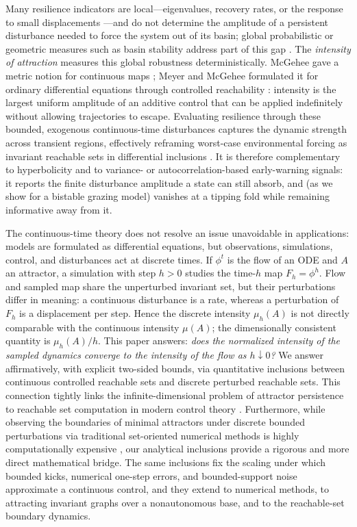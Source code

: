 \documentclass[pdflatex,sn-mathphys-num]{sn-jnl}
\numberwithin{equation}{section}
\theoremstyle{thmstyleone}%
\theoremstyle{definition}
\theoremstyle{remark}
\begin{document}
Many resilience indicators are local---eigenvalues, recovery rates, or the response to small displacements \citep{krakovska2024resilience}---and do not determine the amplitude of a persistent disturbance needed to force the system out of its basin; global probabilistic or geometric measures such as basin stability address part of this gap \citep{menck2013basin,menck2014dead,liang2025global,mitra2015integrative,klinshov2016stability,wang2025multi}. The \emph{intensity of attraction} measures this global robustness deterministically. McGehee gave a metric notion for continuous maps \citep{mcgehee1988some}; Meyer and McGehee formulated it for ordinary differential equations through controlled reachability \citep{meyer2022intensity}: intensity is the largest uniform amplitude of an additive control that can be applied indefinitely without allowing trajectories to escape. Evaluating resilience through these bounded, exogenous continuous-time disturbances captures the dynamic strength across transient regions, effectively reframing worst-case environmental forcing as invariant reachable sets in differential inclusions \citep{li2007morse,meyer2016mathematical}. It is therefore complementary to hyperbolicity and to variance- or autocorrelation-based early-warning signals: it reports the finite disturbance amplitude a state can still absorb, and (as we show for a bistable grazing model) vanishes at a tipping fold while remaining informative away from it.

The continuous-time theory does not resolve an issue unavoidable in applications: models are formulated as differential equations, but observations, simulations, control, and disturbances act at discrete times.
If $\phi^t$ is the flow of an ODE and $A$ an attractor, a simulation with step $h>0$ studies the time-$h$ map $F_h=\phi^h$. Flow and sampled map share the unperturbed invariant set, but their perturbations differ in meaning: a continuous disturbance is a rate, whereas a perturbation of $F_h$ is a displacement per step. Hence the discrete intensity $\mu_h(A)$ is not directly comparable with the continuous intensity $\mu(A)$; the dimensionally consistent quantity is $\mu_h(A)/h$. This paper answers: \emph{does the normalized intensity of the sampled dynamics converge to the intensity of the flow as $h\downarrow0$?} We answer affirmatively, with explicit two-sided bounds, via quantitative inclusions between continuous controlled reachable sets and discrete perturbed reachable sets.
This connection tightly links the infinite-dimensional problem of attractor persistence to reachable set computation in modern control theory \citep{de2011level,wang2026algebraic,rieger2016euler}.
Furthermore, while observing the boundaries of minimal attractors under discrete bounded perturbations via traditional set-oriented numerical methods is highly computationally expensive \citep{dellnitz2001algorithms}, our analytical inclusions provide a rigorous and more direct mathematical bridge. The same inclusions fix the scaling under which bounded kicks, numerical one-step errors, and bounded-support noise approximate a continuous control, and they extend to numerical methods, to attracting invariant graphs over a nonautonomous base, and to the reachable-set boundary dynamics.
\end{document}
